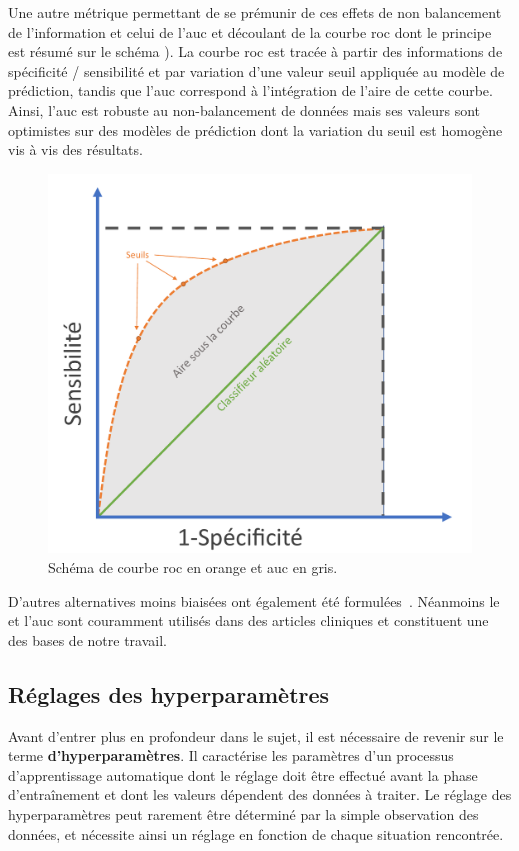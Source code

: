 Une autre métrique permettant de se prémunir de ces effets de non balancement de l'information et celui de l'\acs{auc} et découlant de la courbe \gls{roc} dont le principe est résumé sur le schéma ). La courbe \gls{roc} est tracée à partir des informations de spécificité / sensibilité et par variation d'une valeur seuil appliquée au modèle de prédiction, tandis que l'\gls{auc} correspond à l'intégration de l'aire de cette courbe. Ainsi, l'\gls{auc} est robuste au non-balancement de données mais ses valeurs sont optimistes sur des modèles de prédiction dont la variation du seuil est homogène vis à vis des résultats.\par

\begin{figure}[H]
    \centering
    \includegraphics[width=0.80\linewidth]{contents/chapter_3/resources/scheme_roc_curve.pdf}
    \caption{Schéma de courbe \gls{roc} en orange et \gls{auc} en gris.}
    \label{fig:scheme_roc_curve}
\end{figure}

D'autres alternatives moins biaisées ont également été formulées~\cite{Sokolova2006}. Néanmoins le \fscore{} et l'\gls{auc} sont couramment utilisés dans des articles cliniques et constituent une des bases de notre travail.\par

\clearpage

\subsection{Réglages des hyperparamètres}
\label{subsec:hyperparameter}
Avant d’entrer plus en profondeur dans le sujet, il est nécessaire de revenir sur le terme \textbf{d’hyperparamètres}. Il caractérise les paramètres d'un processus d'apprentissage automatique dont le réglage doit être effectué avant la phase d'entraînement et dont les valeurs dépendent des données à traiter. Le réglage des hyperparamètres peut rarement être déterminé par la simple observation des données, et nécessite ainsi un réglage en fonction de chaque situation rencontrée.\par

